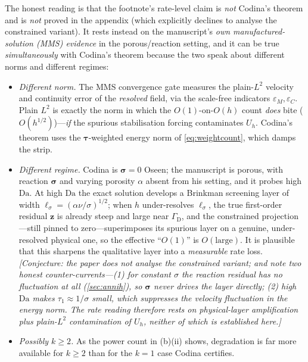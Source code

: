 \documentclass[11pt]{article}
\newcommand{\Damk}{\mathrm{Da}}
\newcommand{\bsig}{\boldsymbol{\sigma}}
\newcommand{\bz}{\boldsymbol{z}}
\newcommand{\Uh}{U_{h}}
\theoremstyle{plain}
\theoremstyle{definition}
\theoremstyle{remark}
\begin{document}
The honest reading is that the footnote's rate-level claim is \emph{not}
Codina's theorem and is \emph{not} proved in the appendix (which
explicitly declines to analyse the constrained variant). It rests
instead on the manuscript's \emph{own manufactured-solution (MMS)
evidence} in the porous/reaction setting, and it can be true
\emph{simultaneously} with Codina's theorem because the two speak about
different norms and different regimes:
%
\begin{itemize}
\item \emph{Different norm.} The MMS convergence gate measures the
  plain-$L^2$ velocity and continuity error of the \emph{resolved}
  field, via the scale-free indicators $\varepsilon_M,\varepsilon_C$.
  Plain $L^2$ is exactly the norm in which the $O(1)$-on-$O(h)$ count
  \emph{does} bite ($O(h^{1/2})$)---\emph{if} the spurious stabilisation
  forcing contaminates $\Uh$. Codina's theorem uses the $\bm\tau$-weighted
  energy norm of \cref{eq:weightcount}, which damps the strip.
\item \emph{Different regime.} Codina is $\bsig=0$ Oseen; the manuscript
  is porous, with reaction $\bsig$ and varying porosity $\alpha$ absent
  from his setting, and it probes high $\Damk$. At high $\Damk$ the exact
  solution develops a Brinkman screening layer of width
  $\ell_\sigma=(\alpha\nu/\sigma)^{1/2}$; when $h$ under-resolves
  $\ell_\sigma$, the true first-order residual $\bz$ is already steep and
  large near $\Gamma_{\mathrm D}$, and the constrained projection---still
  pinned to zero---superimposes its spurious layer on a genuine,
  under-resolved physical one, so the effective ``$O(1)$'' is
  $O(\text{large})$. It is plausible that this sharpens the qualitative
  layer into a \emph{measurable} rate loss. \emph{[Conjecture: the paper
  does not analyse the constrained variant; and note two honest
  counter-currents---(1) for constant $\sigma$ the reaction residual has
  \emph{no} fluctuation at all (\cref{sec:annih}), so $\bsig$ never drives
  the layer directly; (2) high $\Damk$ makes $\tau_1\approx1/\sigma$
  small, which \emph{suppresses} the velocity fluctuation in the energy
  norm. The rate reading therefore rests on physical-layer amplification
  plus plain-$L^2$ contamination of $\Uh$, neither of which is
  established here.]}
\item \emph{Possibly $k\ge2$.} As the power count in (b)(ii) shows,
  degradation is far more available for $k\ge2$ than for the $k=1$ case
  Codina certifies.
\end{itemize}
\end{document}
